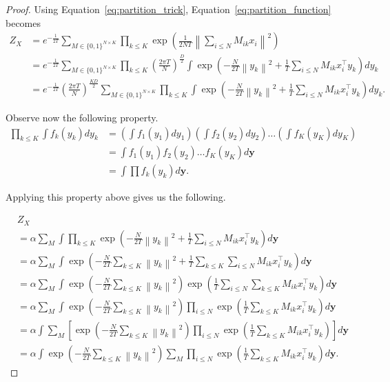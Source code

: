 \begin{proof}
Using Equation~\ref{eq:partition_trick}, Equation~\ref{eq:partition_function} becomes
%
\begin{align}
Z_X &= e^{-\frac{1}{2T}}\sum_{M \in \{0, 1\}^{N \times K}}\prod_{k \leq K} \exp\left(\frac{1}{2NT}\left\|\sum_{i \leq N} M_{ik}x_i\right\|^2\right)\\
&= e^{-\frac{1}{2T}}\sum_{M \in \{0, 1\}^{N \times K}}\prod_{k \leq K} \left(\frac{2\pi T}{N}\right)^{\frac{D}{2}} \int \exp\left(- \frac{N}{2T}\left\|y_k\right\|^2 + \frac{1}{T}\sum_{i \leq N}M_{ik}x_i^\top y_k\right)dy_k\\
&= e^{-\frac{1}{2T}}\left(\frac{2\pi T}{N}\right)^{\frac{KD}{2}}\sum_{M \in \{0, 1\}^{N \times K}}\prod_{k \leq K}  \int \exp\left(- \frac{N}{2T}\left\|y_k\right\|^2 + \frac{1}{T}\sum_{i \leq N}M_{ik}x_i^\top y_k\right)dy_k.
\end{align}

Observe now the following property.
%
\begin{align*}
\prod_{k \leq K} \int f_k(y_k) dy_k &= \left(\int f_1(y_1) dy_1\right)\left(\int f_2(y_2) dy_2\right)\ldots \left(\int f_K(y_K) dy_K\right)\\
&= \int f_1(y_1) f_2(y_2) \ldots f_K(y_K) d\mathbf{y}\\
&= \int \prod f_k(y_k) d\mathbf{y}.
\end{align*}

Applying this property above gives us the following.

\begin{align}
&Z_X\\
&= \alpha\sum_M\int \prod_{k \leq K} \exp\left(- \frac{N}{2T}\left\|y_k\right\|^2 + \frac{1}{T}\sum_{i \leq N}M_{ik}x_i^\top y_k\right)d\mathbf{y}\\
&= \alpha\sum_M\int \exp\left(- \frac{N}{2T}\sum_{k \leq K}\left\|y_k\right\|^2 + \frac{1}{T}\sum_{k \leq K}\sum_{i \leq N}M_{ik}x_i^\top y_k\right)d\mathbf{y}\\
&= \alpha\sum_M\int \exp\left(- \frac{N}{2T}\sum_{k \leq K}\left\|y_k\right\|^2\right)\exp\left(\frac{1}{T}\sum_{i \leq N}\sum_{k \leq K}M_{ik}x_i^\top y_k\right)d\mathbf{y}\\
&= \alpha\sum_M\int \exp\left(- \frac{N}{2T}\sum_{k \leq K}\left\|y_k\right\|^2\right)\prod_{i \leq N}\exp\left(\frac{1}{T}\sum_{k \leq K}M_{ik}x_i^\top y_k\right)d\mathbf{y}\\
&= \alpha\int \sum_{M}\left[\exp\left(- \frac{N}{2T}\sum_{k \leq K}\left\|y_k\right\|^2\right)\prod_{i \leq N}\exp\left(\frac{1}{T}\sum_{k \leq K}M_{ik}x_i^\top y_k\right)\right]d\mathbf{y}\\
&= \alpha\int \exp\left(- \frac{N}{2T}\sum_{k \leq K}\left\|y_k\right\|^2\right)\sum_{M}\prod_{i \leq N}\exp\left(\frac{1}{T}\sum_{k \leq K}M_{ik}x_i^\top y_k\right)d\mathbf{y}.
\end{align}


\end{proof}
